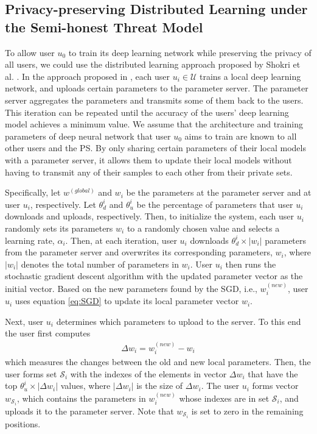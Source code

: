 \documentclass[letterpaper]{article}
\begin{document}
\begin{flushleft}
{%
\subsection{Privacy-preserving Distributed Learning under the Semi-honest Threat Model}
To allow user $u_0$ to train its deep learning network while preserving the privacy of all users, we could use the distributed
learning approach proposed by Shokri et al. \cite{shokri2015privacy}. 
In the approach proposed in \cite{shokri2015privacy}, each user $u_i\in\mathcal{U}$ trains a local deep learning
network, and uploads certain parameters to the parameter server. The parameter server aggregates the parameters and transmits some of
them back to the users. This iteration can be repeated until the accuracy of the users' deep learning model achieves a minimum value. 
We assume that the architecture and training parameters of  deep neural network that user $u_0$ aims to
train are known  to all other users and the PS.
By only sharing certain parameters of their local models
with a parameter server, it allows them to update their local models without having to transmit any of their samples to each other
from their private sets. 

Specifically, let  $w^{(global)}$ and $w_i$ be the parameters at the parameter server and at user $u_i$, respectively. Let 
$\theta_d^{i}$ and $\theta_u^{i}$ be the percentage of parameters that user $u_i$ downloads and uploads, respectively. Then, 
to initialize the system,  each user $u_i$ randomly sets its parameters $w_i$ to a randomly chosen value and selects a learning rate,
$\alpha_i$. Then, at each iteration,  user $u_i$  downloads $\theta_d^{i} \times |w_i|$ parameters from the parameter server and
overwrites its corresponding parameters, $w_i$, where $|w_i|$ denotes the total number of parameters in $w_i$. User $u_i$ then runs the
stochastic gradient descent algorithm 
with the updated parameter vector as the initial vector. 
Based on the new parameters found by the SGD, i.e., $w_i^{(new)}$, user $u_i$ uses equation \eqref{eq:SGD} to update its local parameter vector $w_i$. 

Next, user $u_i$ determines which parameters to upload to the server. 
To this end the user first computes 
\begin{align}\label{eq:deltaParam}
\Delta w_i =  w_i^{(new)} -  w_i
\end{align}
which measures the changes between the old and new
local parameters. Then, the user forms set $\mathcal{S}_i$ with the indexes of the elements in vector $\Delta w_i$ that have the top 
$\theta_u^{i} \times |\Delta w_i|$ values, where $|\Delta w_i|$ is the size of $\Delta w_i$. 
The user $u_i$ forms vector $w_{\mathcal{S}_i}$, which contains the parameters in $w_i^{(new)}$ whose indexes are in
set $\mathcal{S}_i$, and uploads it to the parameter server. Note that $w_{\mathcal{S}_i}$  is set to zero in the remaining
positions. 

}
\end{flushleft}
\end{document}
